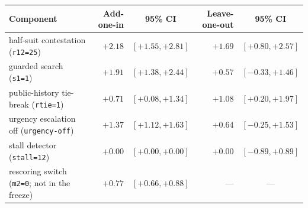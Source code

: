 \begin{tabular}{lrcrc}
\toprule
Component & Add-one-in & 95\% CI & Leave-one-out & 95\% CI \\
\midrule
half-suit contestation (\texttt{r12=25}) & $+2.18$ & $[+1.55, +2.81]$ & $+1.69$ & $[+0.80, +2.57]$ \\
guarded search (\texttt{s1=1}) & $+1.91$ & $[+1.38, +2.44]$ & $+0.57$ & $[-0.33, +1.46]$ \\
public-history tie-break (\texttt{rtie=1}) & $+0.71$ & $[+0.08, +1.34]$ & $+1.08$ & $[+0.20, +1.97]$ \\
urgency escalation off (\texttt{urgency-off}) & $+1.37$ & $[+1.12, +1.63]$ & $+0.64$ & $[-0.25, +1.53]$ \\
stall detector (\texttt{stall=12}) & $+0.00$ & $[+0.00, +0.00]$ & $+0.00$ & $[-0.89, +0.89]$ \\
rescoring switch (\texttt{m2=0}; not in the freeze) & $+0.77$ & $[+0.66, +0.88]$ & --- & --- \\
\bottomrule
\end{tabular}
